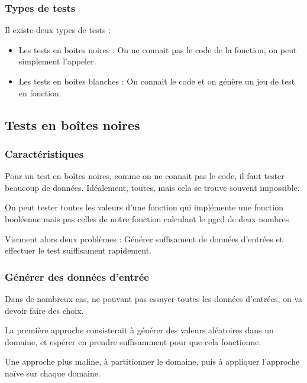 \subsubsection{Types de tests}

Il existe deux types de tests : 
\begin{itemize}
	\item Les tests en boites noires : On ne connait pas le code de la fonction, on peut simplement l'appeler. 
	\item Les tests en boites blanches : On connait le code et on génère un jeu de test en fonction. 
\end{itemize}

\subsection{Tests en boîtes noires}

\subsubsection{Caractéristiques}

Pour un test en boîtes noires, comme on ne connait pas le code, il faut tester beaucoup de données. Idéalement, toutes, mais cela se trouve souvent impossible.

\begin{example}
	On peut tester toutes les valeurs d'une fonction qui implémente une fonction booléenne mais pas celles de notre fonction calculant le pgcd de deux nombres
\end{example}

Viennent alors deux problèmes : Générer suffisament de données d'entrées et effectuer le test suiffisament rapidement.

\subsubsection{Générer des données d'entrée}

Dans de nombreux cas, ne pouvant pas essayer toutes les données d'entrées, on va devoir faire des choix.

\begin{idee}
	La première approche consisterait à générer des valeurs aléatoires dans un domaine, et espérer en prendre suffisamment pour que cela fonctionne.
\end{idee}

\begin{principe}
	Une approche plus maline, à partitionner le domaine, puis à appliquer l'approche naïve sur chaque domaine.
\end{principe}

